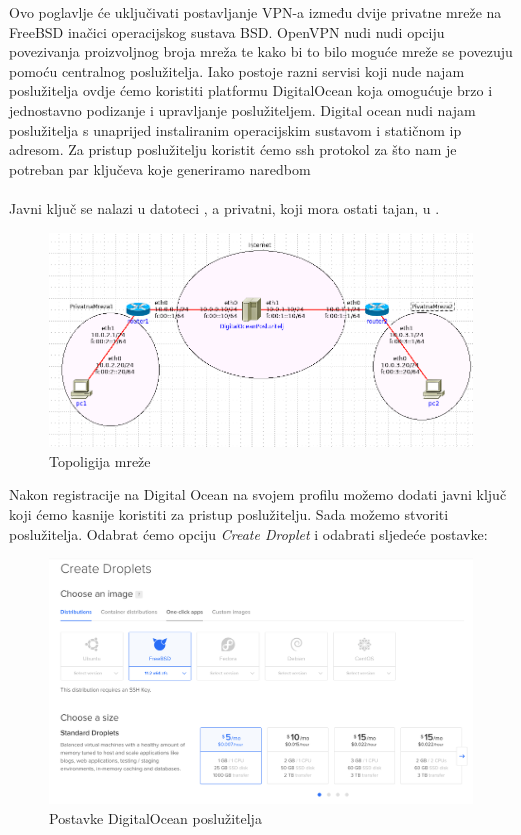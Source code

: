 Ovo poglavlje će uključivati postavljanje VPN-a između dvije privatne mreže 
na FreeBSD inačici operacijskog sustava BSD. 
    OpenVPN nudi nudi opciju povezivanja proizvoljnog broja mreža te kako bi to
    bilo moguće mreže se povezuju pomoću centralnog poslužitelja. 
    Iako postoje razni servisi koji nude najam poslužitelja ovdje
    ćemo koristiti platformu DigitalOcean koja omogućuje brzo i jednostavno
    podizanje i upravljanje poslužiteljem. Digital ocean nudi najam
    poslužitelja s unaprijed instaliranim operacijskim sustavom i statičnom ip
    adresom. Za pristup poslužitelju koristit ćemo
    ssh protokol za što nam je potreban par ključeva koje generiramo naredbom \\

    \noindent
     \\

    \noindent
    Javni ključ se nalazi u datoteci , a privatni, koji
    mora ostati tajan, u .

    \begin{figure}[H]
        \centering
        \includegraphics[scale=0.4]{slike/bsdtop}
        \caption{Topoligija mreže}
    \end{figure}

    Nakon registracije na Digital Ocean na svojem profilu možemo dodati javni ključ
    koji ćemo kasnije koristiti za pristup poslužitelju. Sada možemo stvoriti
    poslužitelja. Odabrat ćemo opciju
    \textit{Create Droplet} i odabrati sljedeće postavke:

    \begin{figure}[h]
        \centering
        \includegraphics[scale=0.35]{slike/postavkeDOserver}
        \caption{Postavke DigitalOcean poslužitelja}
    \end{figure}

